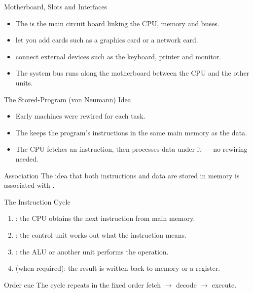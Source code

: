 \documentclass[aspectratio=169]{beamer}
\begin{document}
\begin{frame}{Motherboard, Slots and Interfaces}
  \begin{itemize}
    \item The  is the main circuit board linking the CPU,
      memory and buses.
    \item {} let you add cards such as a graphics card or
      a network card.
    \item {} connect external devices such as the
      keyboard, printer and monitor.
    \item The system bus runs along the motherboard between the CPU and the
      other units.
  \end{itemize}
\end{frame}

\begin{frame}{The Stored-Program (von Neumann) Idea}
  \begin{itemize}
    \item Early machines were rewired for each task.
    \item The  keeps the program's instructions
      in the same main memory as the data.
    \item The CPU fetches an instruction, then processes data under it ---
      no rewiring needed.
  \end{itemize}
  \begin{block}{Association}
    The idea that both instructions and data are stored in memory is
    associated with .
  \end{block}
\end{frame}

\begin{frame}{The Instruction Cycle}
  \begin{enumerate}
    \item {}: the CPU obtains the next instruction from main
      memory.
    \item {}: the control unit works out what the instruction
      means.
    \item {}: the ALU or another unit performs the operation.
    \item {} (when required): the result is written back to memory
      or a register.
  \end{enumerate}
  \begin{alertblock}{Order cue}
    The cycle repeats in the fixed order fetch $\rightarrow$ decode
    $\rightarrow$ execute.
  \end{alertblock}
\end{frame}
\end{document}
